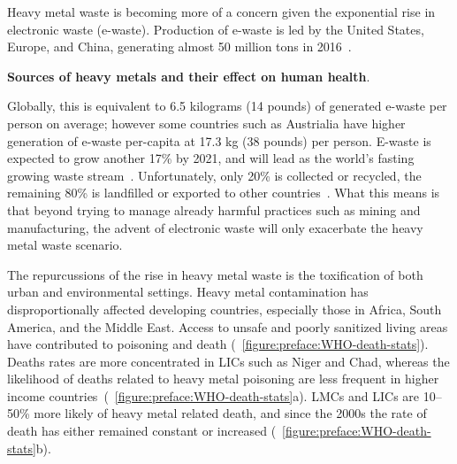 \documentclass[../main/main]{subfiles}
\begin{document}
Heavy metal waste is becoming more of a concern given the exponential rise in electronic waste (e-waste). Production of e-waste is led by the United States, Europe, and China, generating almost 50 million tons in 2016~\cite{robinson2009,unitednationsuniversity2017}.

\begin{table}[H]
	\small
	\centering
	\singlespacing
	\def\arraystretch{1.33} %
	
	\caption[Sources of heavy metals and their effect on human health]
	{
		\textbf{Sources of heavy metals and their effect on human health}\protect\footnotemark.
	}
	\label{table:preface:metal-health-stats}
\end{table}

\noindent Globally, this is equivalent to 6.5 kilograms (14 pounds) of generated e-waste per person on average; however some countries such as Austrialia have higher generation of e-waste per-capita at 17.3 kg (38 pounds) per person. E-waste is expected to grow another 17\% by 2021, and will lead as the world's fasting growing waste stream~\cite{unitednationsuniversity2017}. Unfortunately, only 20\% is collected or recycled, the remaining 80\% is landfilled or exported to other countries~\cite{schmidt2006,unitednationsuniversity2017}. What this means is that beyond trying to manage already harmful practices such as mining and manufacturing, the advent of electronic waste will only exacerbate the heavy metal waste scenario.

The repurcussions of the rise in heavy metal waste is the toxification of both urban and environmental settings. Heavy metal contamination has disproportionally affected developing countries, especially those in Africa, South America, and the Middle East. Access to unsafe and poorly sanitized living areas have contributed to poisoning and death (\FIGURE~\ref{figure:preface:WHO-death-stats}).
Deaths rates are more concentrated in LICs such as Niger and Chad, whereas the likelihood of deaths related to heavy metal poisoning are less frequent in higher income countries~(\FIGURE~\ref{figure:preface:WHO-death-stats}a).
LMCs and LICs are 10--50\% more likely of heavy metal related death, and since the 2000s the rate of death has either remained constant or increased (\FIGURE~\ref{figure:preface:WHO-death-stats}b).
\end{document}
